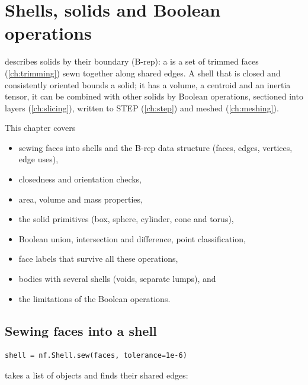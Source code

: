 \chapter{Shells, solids and Boolean operations}\label{ch:solids}

\NF{} describes solids by their boundary (B-rep): a  is a set of trimmed faces
(\cref{ch:trimming}) sewn together along shared edges. A shell that is closed and
consistently oriented bounds a solid; it has a volume, a centroid and an inertia tensor, it
can be combined with other solids by Boolean operations, sectioned into layers
(\cref{ch:slicing}), written to STEP (\cref{ch:step}) and meshed (\cref{ch:meshing}).

This chapter covers
\begin{itemize}
\item sewing faces into shells and the B-rep data structure (faces, edges, vertices, edge uses),
\item closedness and orientation checks,
\item area, volume and mass properties,
\item the solid primitives (box, sphere, cylinder, cone and torus),
\item Boolean union, intersection and difference, point classification,
\item face labels that survive all these operations,
\item bodies with several shells (voids, separate lumps), and
\item the limitations of the Boolean operations.
\end{itemize}

\section{Sewing faces into a shell}\label{sec:sew}

\begin{lstlisting}
shell = nf.Shell.sew(faces, tolerance=1e-6)
\end{lstlisting}

 takes a list of  objects and finds their shared
edges:

